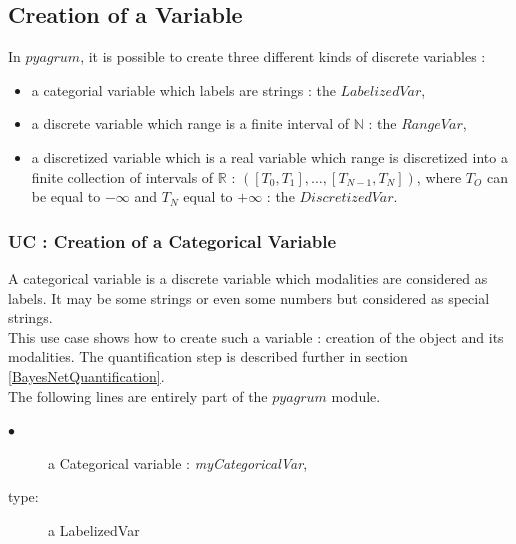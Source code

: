 \newpage \subsection{Creation of a Variable} \label{VariableCreation}

In $pyagrum$, it is possible to create three different kinds of discrete variables : 
\begin{itemize} 
  \item a categorial variable which labels are strings : the $LabelizedVar$,
  \item a discrete variable which range is a finite interval of $\mathbb{N}$ : the $RangeVar$,
  \item a discretized variable which is a real variable which range is discretized into a finite collection of intervals of $\mathbb{R}$ : $([T_0, T_1], \hdots, [T_{N-1}, T_N])$, where $T_O$ can be equal to $-\infty$ and
    $T_N$ equal to $+\infty$ : the $DiscretizedVar$.
\end{itemize}

\subsubsection{UC : Creation of a Categorical Variable}

A categorical variable is a discrete variable which modalities are considered as labels. It may be some strings or even some numbers but considered as special strings.\\

This use case shows how to create such a variable : creation of the object and its modalities. The quantification step is described further in section \ref{BayesNetQuantification}.\\

The following lines are entirely part of the $pyagrum$ module. \\

{
  \begin{description}
  \item[$\bullet$] a Categorical variable  : {\itshape myCategoricalVar},
  \item[type:] a LabelizedVar
  \end{description}
}

